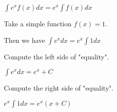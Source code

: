 \documentclass{ximera}
\author{Steven Gubkin}
\begin{document}
\begin{exercise}

$\int e^x f(x) dx= e^x \int f(x) dx$
\begin{hint}
Take a simple function $f(x)=1$. 

Then we have
$\int e^x  dx= e^x \int 1 dx$

Compute the left  side of "equality".

$ \int e^x dx=e^x+C$

Compute the right  side of "equality".

$e^x \int1 dx=e^x\left(x+C\right)$
\end{hint}
	\begin{multipleChoice}	
	\end{multipleChoice}

\end{exercise}
\end{document}
